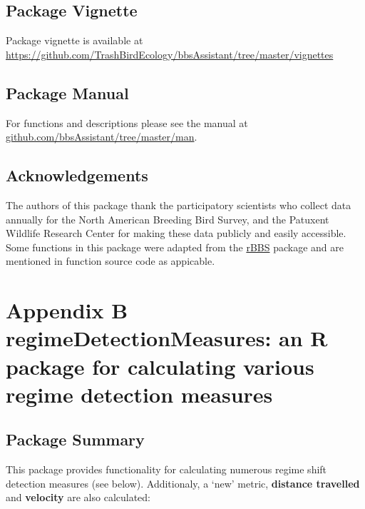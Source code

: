 \documentclass[print]{nuthesis}
\begin{document}
\hypertarget{package-vignette}{%
\section{Package Vignette}\label{package-vignette}}

Package vignette is available at \url{https://github.com/TrashBirdEcology/bbsAssistant/tree/master/vignettes}

\hypertarget{package-manual}{%
\section{Package Manual}\label{package-manual}}

For functions and descriptions please see the manual at \href{https://github.com/TrashBirdEcology/bbsAssistant/tree/master/man}{github.com/bbsAssistant/tree/master/man}.

\hypertarget{acknowledgements-1}{%
\section{Acknowledgements}\label{acknowledgements-1}}

The authors of this package thank the participatory scientists who collect data annually for the North American Breeding Bird Survey, and the Patuxent Wildlife Research Center for making these data publicly and easily accessible. Some functions in this package were adapted from the \href{github.com/oharar/rbbs}{rBBS} package and are mentioned in function source code as appicable.

\appendix

\hypertarget{regimeDetectionMeasures}{%
\chapter*{Appendix B regimeDetectionMeasures: an R package for calculating various regime detection measures}\label{regimeDetectionMeasures}}

\hypertarget{package-summary-1}{%
\section{Package Summary}\label{package-summary-1}}

This package provides functionality for calculating numerous regime shift detection measures (see below). Additionaly, a `new' metric, \textbf{distance travelled} and \textbf{velocity} are also calculated:
\end{document}
